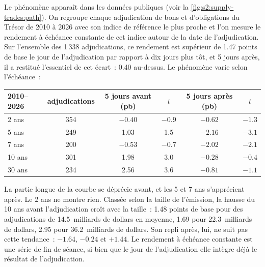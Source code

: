 Le phénomène apparaît dans les données publiques (voir la \cref{fig:s2:supply-trades:path}). On regroupe chaque adjudication de bons et d'obligations du Trésor de 2010 à 2026 avec son indice de référence le plus proche
et l'on mesure le rendement à échéance constante de cet indice autour de la date de l'adjudication. Sur l'ensemble des 1\,338 adjudications, ce rendement est supérieur de 1.47 points de base
le jour de l'adjudication par rapport à dix jours plus tôt, et 5 jours après, il a restitué l'essentiel de cet écart~: 0.40 au-dessus. Le phénomène varie selon l'échéance~:

\begin{center}
\small
\begin{tabular}{@{}lccccc@{}}
\toprule
2010--2026 & adjudications & 5 jours avant (pb) & $t$ & 5 jours après (pb) & $t$\\
\midrule
2 ans & 354 & $-0.40$ & $-0.9$ & $-0.62$ & $-1.3$\\
5 ans & 249 & 1.03 & 1.5 & $-2.16$ & $-3.1$\\
7 ans & 200 & $-0.53$ & $-0.7$ & $-2.02$ & $-2.1$\\
10 ans & 301 & 1.98 & 3.0 & $-0.28$ & $-0.4$\\
30 ans & 234 & 2.56 & 3.6 & $-0.81$ & $-1.1$\\
\bottomrule
\end{tabular}
\end{center}

La partie longue de la courbe se déprécie avant, et les 5 et 7 ans s'apprécient après. Le 2 ans ne montre rien. Classée selon la taille de l'émission, la hausse du 10 ans avant
l'adjudication croît avec la taille~: 1.48 points de base pour des adjudications de 14.5~milliards de dollars en moyenne, 1.69 pour 22.3~milliards de dollars, 2.95 pour 36.2~milliards de dollars. Son
repli après, lui, ne suit pas cette tendance~: $-1.64$, $-0.24$ et $+1.44$. Le rendement à échéance constante est une série de fin de séance, si bien que le jour de l'adjudication elle intègre déjà le
résultat de l'adjudication.

\begin{omfigure}

\label{fig:s2:supply-trades:path}
\end{omfigure}

